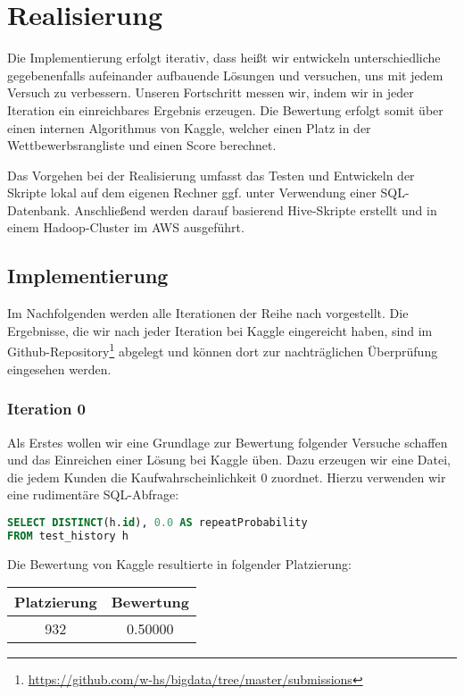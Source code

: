 \section{Realisierung}

Die Implementierung erfolgt iterativ, dass heißt wir entwickeln unterschiedliche gegebenenfalls aufeinander aufbauende Lösungen
und versuchen, uns mit jedem Versuch zu verbessern. Unseren Fortschritt messen wir, indem wir in jeder Iteration ein einreichbares Ergebnis erzeugen. Die Bewertung erfolgt somit über einen internen Algorithmus von Kaggle, welcher einen Platz in der Wettbewerbsrangliste und einen Score berechnet.

Das Vorgehen bei der Realisierung umfasst das Testen und Entwickeln der Skripte lokal auf 
dem eigenen Rechner ggf. unter Verwendung einer SQL-Datenbank. 
Anschließend werden darauf basierend Hive-Skripte erstellt und in einem Hadoop-Cluster
im AWS ausgeführt.

\subsection{Implementierung}
Im Nachfolgenden werden alle Iterationen der Reihe nach vorgestellt. Die Ergebnisse, 
die wir nach jeder Iteration bei Kaggle eingereicht haben, sind im
Github-Repository\footnote{\url{https://github.com/w-hs/bigdata/tree/master/submissions}}
abgelegt und können dort zur nachträglichen Überprüfung eingesehen werden.

\subsubsection{Iteration 0}
\label{sec:iteration0}

Als Erstes wollen wir eine Grundlage zur Bewertung folgender Versuche schaffen und das Einreichen einer
Lösung bei Kaggle üben. Dazu erzeugen wir eine Datei, die jedem Kunden die Kaufwahrscheinlichkeit 0
zuordnet. Hierzu verwenden wir eine rudimentäre SQL-Abfrage:

\begin{lstlisting}[language=SQL]
SELECT DISTINCT(h.id), 0.0 AS repeatProbability 
FROM test_history h
\end{lstlisting}

Die Bewertung von Kaggle resultierte in folgender Platzierung:

\begin{tabular}{|c|c|}
	\hline \textbf{Platzierung} & \textbf{Bewertung} \\ 
	\hline 932 & 0.50000  \\ 
	\hline 
\end{tabular}

